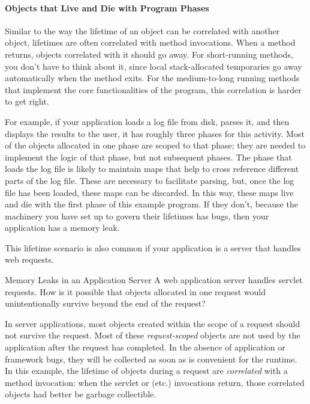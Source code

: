 \paragraph{Objects that Live and Die with Program Phases}
\label{sec:correlated-lifetime-2}

Similar to the way the lifetime of an object can be correlated with another
object, lifetimes are often correlated with method invocations. When a method
returns, objects correlated with it should go away. For
short-running methods, you don't have to think about it, since local
stack-allocated temporaries go away automatically when the method exits. For the
medium-to-long running methods that implement the core functionalities of the program, this correlation is harder to get right.

For example, if your application loads a log file from disk,
parses it, and then displays the results to the user, it has roughly three
phases for this activity. Most of the objects allocated in one phase are scoped to that
phase; they are needed to implement the logic of that phase, but not subsequent
phases. The phase that loads the log file is likely to maintain maps that
help to cross reference different parts of the log file. These are necessary
to facilitate parsing, but, once the log file has been loaded, these maps can be
discarded. In this way, these maps live and die with the first phase of this
example program. If they don't, because the machinery you have set up to
govern their lifetimes has bugs, then your application has a memory
leak.

This lifetime scenario is also common if your application is a
server that handles web requests.

\begin{example}{Memory Leaks in an Application Server}
	A web application server handles servlet requests. How is it possible that
	objects allocated in one request would unintentionally survive beyond the end
	of the request?
\end{example} 
  
In server applications, most
objects created within the scope of a request should not survive the
request. Most of these \emph{request-scoped}
 objects are not used by the application after the
request has completed. In the absence of application or framework bugs, they will
be collected as soon as is convenient for the runtime. In this example, the
lifetime of objects during a request are \emph{correlated} with a method
invocation: when the servlet  or  (etc.) invocations
return, those correlated objects had better be garbage collectible.

